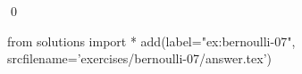 
\begin{ex} 
  \label{ex:bernoulli-07}
  
  \qed
\end{ex} 
\begin{python0}
from solutions import *
add(label="ex:bernoulli-07",
    srcfilename='exercises/bernoulli-07/answer.tex') 
\end{python0}
